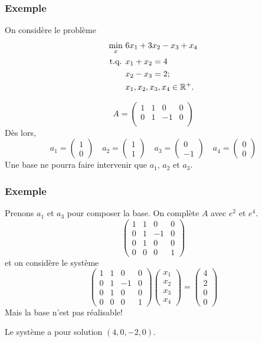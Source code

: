 \documentclass[t,usepdftitle=false]{beamer}
\begin{document}
\begin{frame}
\frametitle{Exemple}

On considère le problème
\begin{align*}
\min_x \ & 6x_1 + 3x_2 - x_3 + x_4 \\
\mbox{t.q. } & x_1 + x_2 = 4 \\
& x_2 - x_3 = 2; \\
& x_1, x_2, x_3, x_4 \in {\mathbb{R}}^+.
\end{align*}

\mbox{}

\[
A = \begin{pmatrix}
1 & 1 & 0 & 0 \\
0 & 1 & -1 & 0 \\
\end{pmatrix}
\]
Dès lors,
\[
a_1 = \begin{pmatrix} 1 \\ 0 \end{pmatrix}
\quad
a_2 = \begin{pmatrix} 1 \\ 1 \end{pmatrix}
\quad
a_3 = \begin{pmatrix} 0 \\ -1 \end{pmatrix}
\quad
a_4 = \begin{pmatrix} 0 \\ 0 \end{pmatrix}
\]
Une base ne pourra faire intervenir que $a_1$, $a_2$ et $a_3$.

\end{frame}

\begin{frame}
\frametitle{Exemple}

Prenons $a_1$ et $a_3$ pour composer la base. On complète $A$ avec $e^2$ et $e^4$.
\[
\begin{pmatrix}
1 & 1 & 0 & 0 \\
0 & 1 & -1 & 0 \\
0 & 1 & 0 & 0 \\
0 & 0 & 0 & 1
\end{pmatrix}
\]
et on considère le système
\[
\begin{pmatrix}
1 & 1 & 0 & 0 \\
0 & 1 & -1 & 0 \\
0 & 1 & 0 & 0 \\
0 & 0 & 0 & 1
\end{pmatrix}
\begin{pmatrix}
x_1 \\ x_2 \\ x_3 \\ x_4
\end{pmatrix}
=
\begin{pmatrix}
4 \\ 2 \\ 0 \\ 0
\end{pmatrix}
\]
Mais la base n'est pas réalisable!

Le système a pour solution $(4, 0, -2, 0)$.
\end{frame}
\end{document}
